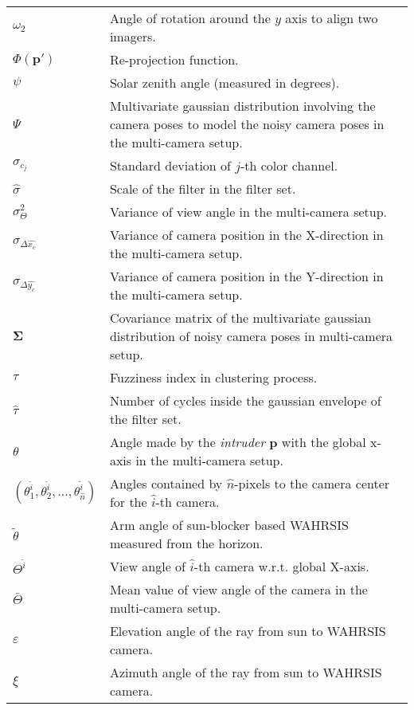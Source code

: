 \begin{longtable}[l]{p{80pt}p{320pt}}
$\omega_2$ & Angle of rotation around the $y$ axis to align two imagers.\\
$\Phi(\mathbf{p}')$ & Re-projection function. \\
$\psi$ & Solar zenith angle (measured in degrees). \\
$\Psi$ & Multivariate gaussian distribution involving the camera poses to model the noisy camera poses in the multi-camera setup. \\
$\sigma_{c_{j}}$ & Standard deviation of $j$-th color channel. \\
$\hat{\sigma}$ & Scale of the filter in the filter set. \\
$\sigma_\Theta^2$ & Variance of view angle in the multi-camera setup.\\
$\sigma_{\Delta \hat{x_c}}$ & Variance of camera position in the X-direction in the multi-camera setup.\\
$\sigma_{\Delta \hat{y_c}}$ & Variance of camera position in the Y-direction in the multi-camera setup.\\
$\mathbf{\Sigma}$ & Covariance matrix of the multivariate gaussian distribution of noisy camera poses in multi-camera setup. \\
$\tau$ & Fuzziness index in clustering process. \\
$\hat{\tau}$ & Number of cycles inside the gaussian envelope of the filter set. \\
$\theta$ & Angle made by the \emph{intruder} $\mathbf{p}$ with the global x-axis in the multi-camera setup.\\
$(\theta_1^{\hat{i}},\theta_2^{\hat{i}},\ldots,\theta_{\hat{n}}^{\hat{i}})$ & Angles contained by $\hat{n}$-pixels to the camera center for the $\hat{i}$-th camera.\\ 
$\tilde{\theta}$ & Arm angle of sun-blocker based WAHRSIS measured from the horizon.\\
$\Theta^{\hat{i}}$ & View angle of $\hat{i}$-th camera w.r.t. global X-axis.\\ 
$\bar{\Theta}$ & Mean value of view angle of the camera in the multi-camera setup.\\
$\varepsilon$ & Elevation angle of the ray from sun to WAHRSIS camera.\\
$\xi$ & Azimuth angle of the ray from sun to WAHRSIS camera.\\













\end{longtable}
